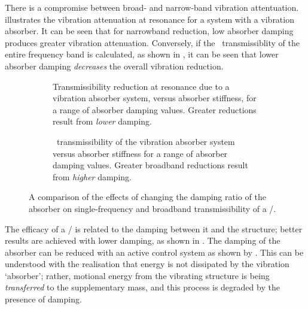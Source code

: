 There is a compromise between broad- and narrow-band vibration attentuation.
 illustrates the vibration attenuation at resonance for a system with a vibration absorber.
It can be seen that for narrowband reduction, low absorber damping produces greater vibration attenuation.
Conversely, if the \RMS\ transmissiblity of the entire frequency band is calculated, as shown in , it can be seen that lower absorber damping \emph{decreases} the overall vibration reduction.

\begin{figure}
\begin{wide}
  \begin{subfigure}
    \caption{
      Transmissibility reduction at resonance due to a vibration absorber system, versus absorber stiffness, for a range of absorber damping values.
      Greater reductions result from \emph{lower} damping.}
  \end{subfigure}
  \begin{subfigure}
    \caption{
      \RMS\ transmissibility of the vibration absorber system versus absorber stiffness for a range of absorber damping values.
    Greater broadband reductions result from \emph{higher} damping.}
  \end{subfigure}
\end{wide}
\caption{
  A comparison of the effects of changing the damping ratio of the absorber on single-frequency and broadband transmissibility of a \vibneut/.
}
\end{figure}

The efficacy of a \vibneut/ is related to the damping between it and the structure; better results are achieved with lower damping, as shown in .
The damping of the absorber can be reduced with an active control system as shown by \textcite{kidner1998}.
This can be understood with the realisation that energy is not dissipated by the vibration `absorber'; rather, motional energy from the vibrating structure is being \emph{transferred} to the supplementary mass, and this process is degraded by the presence of damping.

